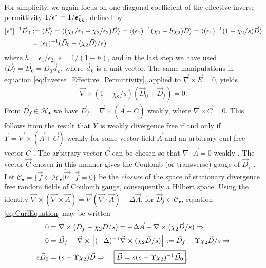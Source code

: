 \documentclass[english,12pt]{ttuthes}
\newcommand\beps{\mbox{\boldmath${\epsilon}$}}
\begin{document}
For simplicity, we again focus on one diagonal coefficient of the effective
inverse permittivity $1/\epsilon^*=1/\beps^*_{kk}$, defined by
%
\begin{align}\label{eq:Inverse_Effective_Permittivity}
  [\epsilon^*]^{-1}\vec{D}_0&:= \langle\vec{E}\rangle= \langle(\chi_1/\epsilon_1+\chi_2/\epsilon_2)\vec{D}\rangle
              =\langle(\epsilon_1)^{-1}(\chi_1+h\chi_2)\vec{D}\rangle=\langle(\epsilon_1)^{-1}(1-\chi_2/s)\vec{D}\rangle
              \notag\\             
              &=(\epsilon_1)^{-1}(\vec{D}_0-\langle\chi_2\vec{D}\rangle/s)
\end{align}
%
where $h=\epsilon_1/\epsilon_2$, $s=1/(1-h)$, and in the last step we have used
$\langle\vec{D}\rangle=\vec{D}_0=D_0\vec{d}_k$, where $\vec{d}_k$ is a unit
vector. The same manipulations in equation
\eqref{eq:Inverse_Effective_Permittivity}, applied to
$\vec{\nabla}\times\vec{E}=0$, yields   
%
\begin{align}\label{eq:CurlEquation}
  \vec{\nabla}\times(1-\chi_2/s)(\vec{D}_0+\vec{D}_f)=0.
\end{align}
%
From $\vec{D}_f\in\mathscr{H}_{\bullet}$ we have
$\vec{D}_f=\vec{\nabla}\times(\vec{A}+\vec{C})$ weakly, where
$\vec{\nabla}\times\vec{C}=0$. This follows from the result that $\vec{Y}$
is weakly divergence free if and only if  
$\vec{Y}=\vec{\nabla}\times(\vec{A}+\vec{C})$ weakly for some vector field
$\vec{A}$ and an arbitrary curl free vector
$\vec{C}$ \cite{Griffiths-1999,Folland:95}. The arbitrary vector
$\vec{C}$ can be chosen so that $\vec{\nabla}\cdot\vec{A}=0$ weakly
\cite{Griffiths-1999}. The vector $\vec{C}$ chosen in this manner
gives the Coulomb (or transverse) gauge of $\vec{D}_f$
\cite{Griffiths-1999,Jackson-1999}. Let
$\mathscr{C}_{\bullet}=\overline{\{\vec{f}\in\mathscr{H}_{\bullet}|\vec{\nabla}\cdot\vec{f}=0\}}$ be the 
\emph{closure} of the space of stationary divergence free random fields
of Coulomb gauge, consequently a Hilbert space. Using the identity
$\vec{\nabla}\times(\vec{\nabla}\times\vec{A})=\vec{\nabla}(\vec{\nabla}\cdot\vec{A})-\Delta\vec{A}$, for
$\vec{D}_f\in\mathscr{C}_{\bullet}$, equation \eqref{eq:CurlEquation} may be
written    
%
\begin{align}\label{eq:ResolventRepDs}
  0&=\vec{\nabla}\times(\vec{D}_f-\chi_2\vec{D}/s)=-\Delta\vec{A}-\vec{\nabla}\times(\chi_2\vec{D}/s)\Rightarrow
  \notag\\   
0&=\vec{D}_f-\vec{\nabla}\times\left[(-\Delta)^{-1}\vec{\nabla}\times(\chi_2\vec{D}/s)\right]:=
\vec{D}_f-\Upsilon\chi_2\vec{D}/s \Rightarrow\notag\\
s\vec{D}_0&=(s-\Upsilon\chi_2)\vec{D}\Rightarrow\quad
\boxed{\vec{D}=s(s-\Upsilon\chi_2)^{-1}\vec{D}_0}.
\end{align}
\end{document}
